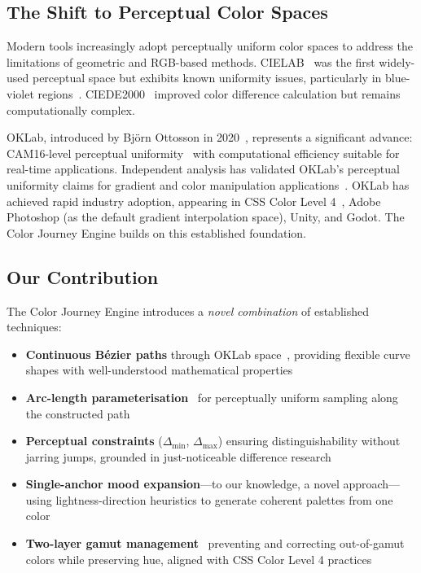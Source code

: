 \subsection*{The Shift to Perceptual Color Spaces}

Modern tools increasingly adopt perceptually uniform color spaces to address the limitations of geometric and RGB-based methods. CIELAB~\cite{cie1976} was the first widely-used perceptual space but exhibits known uniformity issues, particularly in blue-violet regions~\cite{mahy1994}. CIEDE2000~\cite{luo2001} improved color difference calculation but remains computationally complex.

OKLab, introduced by Björn Ottosson in 2020~\cite{ottosson2020}, represents a significant advance: CAM16-level perceptual uniformity~\cite{safdar2017} with computational efficiency suitable for real-time applications. Independent analysis has validated OKLab's perceptual uniformity claims for gradient and color manipulation applications~\cite{levien2021oklab}. OKLab has achieved rapid industry adoption, appearing in CSS Color Level 4~\cite{csscolor4}, Adobe Photoshop (as the default gradient interpolation space), Unity, and Godot. The Color Journey Engine builds on this established foundation.

\subsection*{Our Contribution}

The Color Journey Engine introduces a \emph{novel combination} of established techniques:

\begin{itemize}
    \item \textbf{Continuous Bézier paths} through OKLab space~\cite{farin2002}, providing flexible curve shapes with well-understood mathematical properties
    \item \textbf{Arc-length parameterisation}~\cite{piegl1997,kamermans2023} for perceptually uniform sampling along the constructed path
    \item \textbf{Perceptual constraints} ($\Delta_{\min}$, $\Delta_{\max}$) ensuring distinguishability without jarring jumps, grounded in just-noticeable difference research
    \item \textbf{Single-anchor mood expansion}---to our knowledge, a novel approach---using lightness-direction heuristics to generate coherent palettes from one color
    \item \textbf{Two-layer gamut management}~\cite{morovic2008} preventing and correcting out-of-gamut colors while preserving hue, aligned with CSS Color Level 4 practices~\cite{colorjs2025}
\end{itemize}

